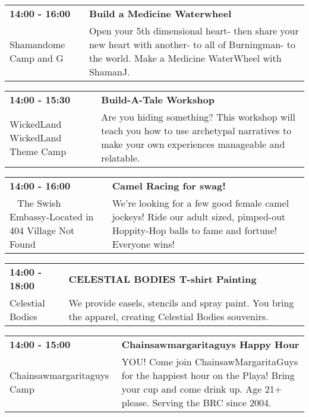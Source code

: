 \begin{tabular}{ p{1in} p{2.2in} }
    \textbf{14:00 - 16:00} & \textbf{Build a Medicine Waterwheel} \\
    Shamandome Camp \newline 615 and G & Open your 5th dimensional heart- then share your new heart with another- to all of Burningman- to the world. Make a Medicine WaterWheel with ShamanJ. \\
    \hline 
\end{tabular}
    
\begin{tabular}{ p{1in} p{2.2in} }
    \textbf{14:00 - 15:30} & \textbf{Build-A-Tale Workshop} \\
    WickedLand \newline WickedLand Theme Camp & Are you hiding something? This workshop will teach you how to use archetypal narratives to make your own experiences manageable and relatable. \\
    \hline 
\end{tabular}
    
\begin{tabular}{ p{1in} p{2.2in} }
    \textbf{14:00 - 16:00} & \textbf{Camel Racing for swag!} \\
    ~ \newline The Swish Embassy-Located in 404 Village Not Found & We're looking for a few good female camel jockeys! Ride our adult sized, pimped-out Hoppity-Hop balls to fame and fortune! Everyone wins! \\
    \hline 
\end{tabular}
    
\begin{tabular}{ p{1in} p{2.2in} }
    \textbf{14:00 - 18:00} & \textbf{CELESTIAL BODIES T-shirt Painting} \\
    Celestial Bodies \newline  & We provide easels, stencils and spray paint. You bring the apparel, creating Celestial Bodies souvenirs. \\
    \hline 
\end{tabular}
    
\begin{tabular}{ p{1in} p{2.2in} }
    \textbf{14:00 - 15:00} & \textbf{Chainsawmargaritaguys Happy Hour} \\
    Chainsawmargaritaguys Camp \newline  & YOU! Come join ChainsawMargaritaGuys for the happiest hour on the Playa! Bring your cup and come drink up. Age 21+ please. Serving the BRC since 2004. \\
    \hline 
\end{tabular}
    
